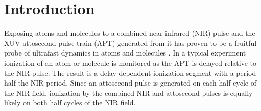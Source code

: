 \documentclass[aps,pra,preprint,groupedaddress]{revtex4-1}
\begin{document}

\section{\label{sec:intro}Introduction}





Exposing atoms and molecules to a combined near infrared (NIR) pulse and the XUV attosecond pulse train (APT) generated from it has proven to be a fruitful probe of ultrafast dynamics in atoms and molecules \cite{Johnsson, Tong, Neidel}. In a typical experiment ionization of an atom or molecule is monitored as the APT is delayed relative to the NIR pulse. The result is a delay dependent ionization segment with a period half the NIR period. Since an attosecond  pulse is generated on each half cycle of the NIR field, ionization by the combined NIR and attosecond pulses is equally likely on both half cycles of the NIR field.
\end{document}

